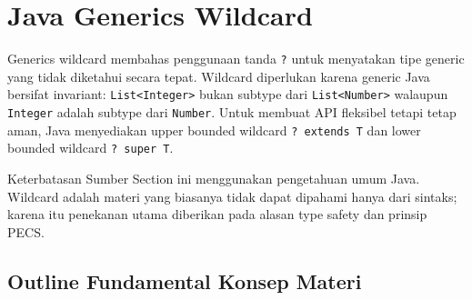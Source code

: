 \section{Java Generics Wildcard}

Generics wildcard membahas penggunaan tanda \texttt{?} untuk menyatakan tipe generic yang tidak diketahui secara tepat. Wildcard diperlukan karena generic Java bersifat invariant: \texttt{List<Integer>} bukan subtype dari \texttt{List<Number>} walaupun \texttt{Integer} adalah subtype dari \texttt{Number}. Untuk membuat API fleksibel tetapi tetap aman, Java menyediakan upper bounded wildcard \texttt{? extends T} dan lower bounded wildcard \texttt{? super T}.

\begin{cmt}{Keterbatasan Sumber}{}
Section ini menggunakan pengetahuan umum Java. Wildcard adalah materi yang biasanya tidak dapat dipahami hanya dari sintaks; karena itu penekanan utama diberikan pada alasan type safety dan prinsip PECS.
\end{cmt}

\subsection{Outline Fundamental Konsep Materi}

